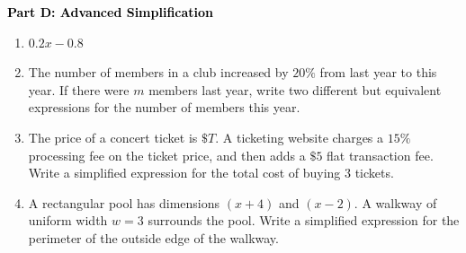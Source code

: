 \documentclass[12pt, letterpaper, fleqn]{article}
\begin{document}
\newpage

\begin{tcolorbox}[colback=customteal!20]
\large\textcolor{black}{\textbf{Part D: Advanced Simplification}}
\end{tcolorbox}

\vspace{3mm}

\begin{enumerate}[itemsep=5.5cm, leftmargin=0.6cm, resume]
\item $0.2x - 0.8$
\item The number of members in a club increased by $20\%$ from last year to this year. If there were $m$ members last year, write two different but equivalent expressions for the number of members this year.
\item The price of a concert ticket is $\$T$. A ticketing website charges a $15\%$ processing fee on the ticket price, and then adds a $\$5$ flat transaction fee. Write a simplified expression for the total cost of buying $3$ tickets.
\item A rectangular pool has dimensions $(x + 4)$ and $(x - 2)$. A walkway of uniform width $w=3$ surrounds the pool. Write a simplified expression for the perimeter of the outside edge of the walkway.
\end{enumerate}
\end{document}
